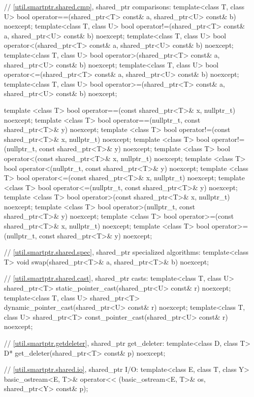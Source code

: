 \begin{codeblock}
{  // \ref{util.smartptr.shared.cmp}, shared_ptr comparisons:
  template<class T, class U>
    bool operator==(shared_ptr<T> const& a, shared_ptr<U> const& b) noexcept;
  template<class T, class U>
    bool operator!=(shared_ptr<T> const& a, shared_ptr<U> const& b) noexcept;
  template<class T, class U>
    bool operator<(shared_ptr<T> const& a, shared_ptr<U> const& b) noexcept;
  template<class T, class U>
    bool operator>(shared_ptr<T> const& a, shared_ptr<U> const& b) noexcept;
  template<class T, class U>
    bool operator<=(shared_ptr<T> const& a, shared_ptr<U> const& b) noexcept;
  template<class T, class U>
    bool operator>=(shared_ptr<T> const& a, shared_ptr<U> const& b) noexcept;

  template <class T>
    bool operator==(const shared_ptr<T>& x, nullptr_t) noexcept;
  template <class T>
    bool operator==(nullptr_t, const shared_ptr<T>& y) noexcept;
  template <class T>
    bool operator!=(const shared_ptr<T>& x, nullptr_t) noexcept;
  template <class T>
    bool operator!=(nullptr_t, const shared_ptr<T>& y) noexcept;
  template <class T>
    bool operator<(const shared_ptr<T>& x, nullptr_t) noexcept;
  template <class T>
    bool operator<(nullptr_t, const shared_ptr<T>& y) noexcept;
  template <class T>
    bool operator<=(const shared_ptr<T>& x, nullptr_t) noexcept;
  template <class T>
    bool operator<=(nullptr_t, const shared_ptr<T>& y) noexcept;
  template <class T>
    bool operator>(const shared_ptr<T>& x, nullptr_t) noexcept;
  template <class T>
    bool operator>(nullptr_t, const shared_ptr<T>& y) noexcept;
  template <class T>
    bool operator>=(const shared_ptr<T>& x, nullptr_t) noexcept;
  template <class T>
    bool operator>=(nullptr_t, const shared_ptr<T>& y) noexcept;

  // \ref{util.smartptr.shared.spec}, shared_ptr specialized algorithms:
  template<class T> void swap(shared_ptr<T>& a, shared_ptr<T>& b) noexcept;

  // \ref{util.smartptr.shared.cast}, shared_ptr casts:
  template<class T, class U>
    shared_ptr<T> static_pointer_cast(shared_ptr<U> const& r) noexcept;
  template<class T, class U>
    shared_ptr<T> dynamic_pointer_cast(shared_ptr<U> const& r) noexcept;
  template<class T, class U>
    shared_ptr<T> const_pointer_cast(shared_ptr<U> const& r) noexcept;

  // \ref{util.smartptr.getdeleter}, shared_ptr get_deleter:
  template<class D, class T> D* get_deleter(shared_ptr<T> const& p) noexcept;

  // \ref{util.smartptr.shared.io}, shared_ptr I/O:
  template<class E, class T, class Y>
    basic_ostream<E, T>& operator<< (basic_ostream<E, T>& os, shared_ptr<Y> const& p);

}
\end{codeblock}
